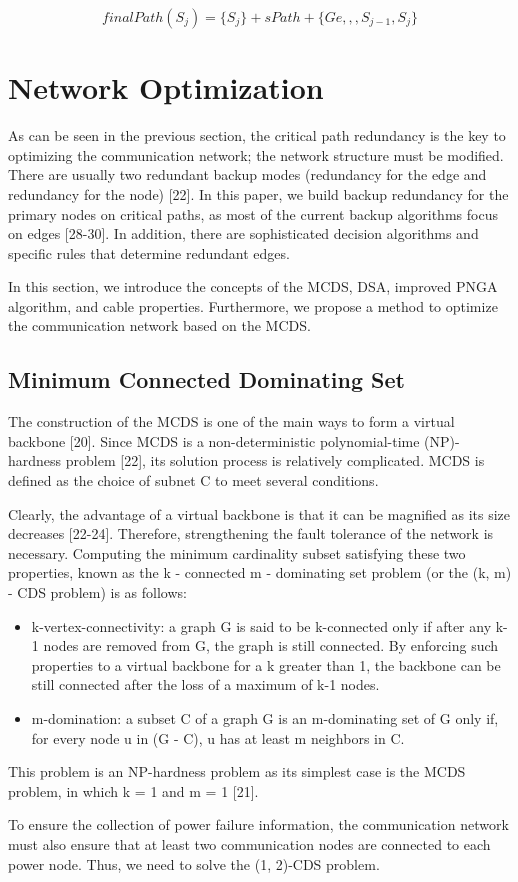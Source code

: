 \documentclass[AMA,STIX1COL]{WileyNJD-v2}
\begin{document}
\begin{equation} 
finalPath(S_{j}) = \{S_{j}\}+sPath + \{Ge,,,S_{j-1},S_{j}\}
\end{equation}

\section{Network Optimization}
\par As can be seen in the previous section, the critical path redundancy is the key to optimizing the communication network; the network structure must be modified. There are usually two redundant backup modes (redundancy for the edge and redundancy for the node) [22]. In this paper, we build backup redundancy for the primary nodes on critical paths, as most of the current backup algorithms focus on edges [28-30]. In addition, there are sophisticated decision algorithms and specific rules that determine redundant edges.
\par In this section, we introduce the concepts of the MCDS, DSA, improved PNGA algorithm, and cable properties. Furthermore, we propose a method to optimize the communication network based on the MCDS. 

\subsection{Minimum Connected Dominating Set}
The construction of the MCDS is one of the main ways to form a virtual backbone [20]. Since MCDS is a non-deterministic polynomial-time (NP)-hardness problem [22], its solution process is relatively complicated. MCDS is defined as the choice of subnet C to meet several conditions.
\par Clearly, the advantage of a virtual backbone is that it can be magnified as its size decreases [22-24]. Therefore, strengthening the fault tolerance of the network is necessary.
Computing the minimum cardinality subset satisfying these two properties, known as the k - connected m - dominating set problem (or the (k, m) - CDS problem) is as follows:

\begin{itemize}
\item k-vertex-connectivity: a graph G is said to be k-connected only if after any k-1 nodes are removed from G, the graph is still connected. By enforcing such properties to a
virtual backbone for a k greater than 1, the backbone can be still connected after the loss of a maximum of k-1 nodes.
\item m-domination: a subset C of a graph G is an m-dominating set of G only if, for every node u in (G - C), u has at least m neighbors in C. 
\end{itemize}
This problem is an NP-hardness problem as its simplest case is the MCDS problem, in which k = 1 and m = 1 [21].
\par To ensure the collection of power failure information, the communication network must also ensure that at least two communication nodes are connected to each power node. Thus, we need to solve the (1, 2)-CDS problem.
\end{document}
